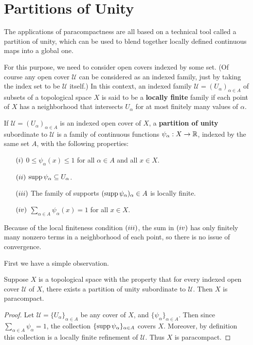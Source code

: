 \section{Partitions of Unity}
The applications of paracompactness are all based on a technical tool called a partition of unity, which can be used to blend together locally defined continuous maps into a global one.\par
For this purpose, we need to consider open covers indexed by some set. (Of course any open cover $\mathcal{U}$ can be considered as an indexed family, just by taking the index set to be $\mathcal{U}$ itself.) In this context, an indexed family $\mathcal{U}=(U_\alpha)_{\alpha\in A}$ of subsets of a topological space $X$ is said to be a \textbf{locally finite} family if each point of $X$ has a neighborhood that intersects $U_\alpha$ for at most finitely many values of $\alpha$.\par
If $\mathcal{U}=(U_\alpha)_{\alpha\in A}$ is an indexed open cover of $X$, a \textbf{partition of unity} subordinate to $\mathcal{U}$ is a family of continuous functions $\psi_\alpha:X\to\mathbb{R}$, indexed by the same set $A$, with the following properties:
\begin{itemize}
\item[$(\rmnum{1})$]$0\leq\psi_\alpha(x)\leq 1$ for all $\alpha\in A$ and all $x\in X$.
\item[$(\rmnum{2})$]$\mathrm{supp}\,\psi_\alpha\subseteq U_\alpha$.
\item[$(\rmnum{3})$]The family of supports $(\mathrm{supp}\,\psi_\alpha)_\alpha\in A$ is locally finite.
\item[$(\rmnum{4})$]$\sum_{\alpha\in A}\psi_\alpha(x)=1$ for all $x\in X$.
\end{itemize}
Because of the local finiteness condition $(\rmnum{3})$, the sum in $(\rmnum{4})$ has only finitely many nonzero terms in a neighborhood of each point, so there is no issue of convergence.\par
First we have a simple observation.
\begin{proposition}\label{partition of unity para}
Suppose $X$ is a topological space with the property that for every indexed open cover $\mathcal{U}$ of $X$, there exists a partition of unity subordinate to $\mathcal{U}$. Then $X$ is paracompact.
\end{proposition}
\begin{proof}
Let $\mathcal{U}=\{U_\alpha\}_{\alpha\in A}$ be any cover of $X$, and $\{\psi_\alpha\}_{\alpha\in A}$. Then since $\sum_{\alpha\in A}\psi_\alpha=1$, the collection $\{\mathrm{supp}\,\psi_\alpha\}_{\alpha\in A}$ covers $X$. Moreover, by definition this collection is a locally finite refinement of $\mathcal{U}$. Thus $X$ is paracompact.
\end{proof}
